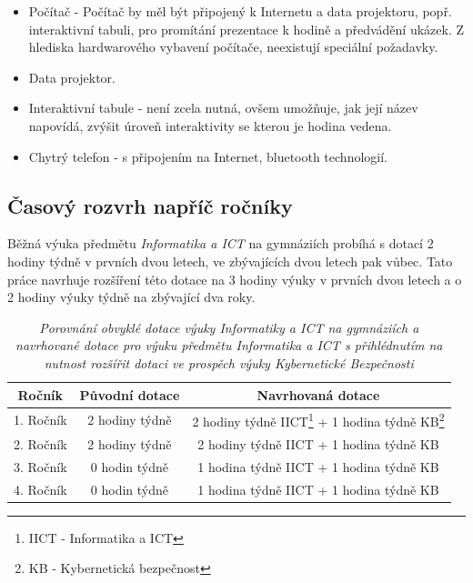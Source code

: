 \documentclass[a4paper, 12pt]{article}
\begin{document}
\begin{itemize}
    \setlength{\itemsep}{-3pt}
    \item Počítač - Počítač by měl být připojený k Internetu a data projektoru, popř. interaktivní tabuli, pro promítání prezentace k hodině a předvádění ukázek. Z hlediska hardwarového vybavení počítače, neexistují speciální požadavky.
    \item Data projektor.
    \item Interaktivní tabule - není zcela nutná, ovšem umožňuje, jak její název napovídá, zvýšit úroveň interaktivity se kterou je hodina vedena.
    \item Chytrý telefon - s připojením na Internet, bluetooth technologií.
\end{itemize}

\subsection{Časový rozvrh napříč ročníky}
Běžná výuka předmětu \textit{Informatika a ICT} na gymnáziích probíhá s dotací 2 hodiny týdně v prvních dvou letech, ve zbývajících dvou letech pak vůbec. Tato práce navrhuje rozšíření této dotace na 3 hodiny výuky v prvních dvou letech a o 2 hodiny výuky týdně na zbývající dva roky.

\renewcommand*\footnoterule{}
\begin{table}[h!]
\begin{minipage}{\textwidth}
\centering
    \begin{tabular}{|c|c|c|}
    \hline
    \textbf{Ročník} & \textbf{Původní dotace} & \textbf{Navrhovaná dotace} \\
    \hline
    1. Ročník & 2 hodiny týdně & 2 hodiny týdně IICT\footnote[1]{ IICT - Informatika a ICT} + 1 hodina týdně KB\footnote[2]{ KB - Kybernetická bezpečnost} \\
    2. Ročník & 2 hodiny týdně & 2 hodiny týdně IICT + 1 hodina týdně KB \\
    3. Ročník & 0 hodin týdně & 1 hodina týdně IICT + 1 hodina týdně KB  \\
    4. Ročník & 0 hodin týdně & 1 hodina týdně IICT + 1 hodina týdně KB  \\
    \hline
    \end{tabular}
    \caption{\textit{Porovnání obvyklé dotace výuky Informatiky a ICT na gymnáziích a navrhované dotace pro výuku předmětu Informatika a ICT s přihlédnutím na nutnost rozšířit dotaci ve prospěch výuky Kybernetické Bezpečnosti}}
\end{minipage}
\end{table}
\end{document}
